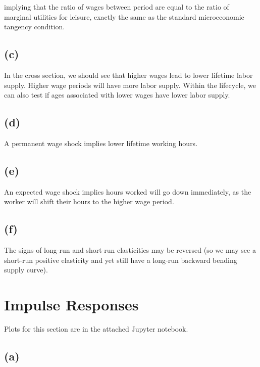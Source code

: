 \documentclass[11pt]{amsart}
\begin{document}
implying that the ratio of wages between period are equal to the ratio of marginal utilities for leisure, exactly the same as the standard microeconomic tangency condition.
    
\subsection*{(c)}
In the cross section, we should see that higher wages lead to lower lifetime labor supply. 
Higher wage periods will have more labor supply.
Within the lifecycle, we can also test if ages associated with lower wages have lower labor supply.

\subsection*{(d)}
A permanent wage shock implies lower lifetime working hours.

\subsection*{(e)}
An expected wage shock implies hours worked will go down immediately, as the worker will shift their hours to the higher wage period.

\subsection*{(f)}
The signs of long-run and short-run elasticities may be reversed (so we may see a short-run positive elasticity and yet still have a long-run backward bending supply curve).

\section{Impulse Responses}



Plots for this section are in the attached Jupyter notebook.

\subsection*{(a)}
\end{document}
